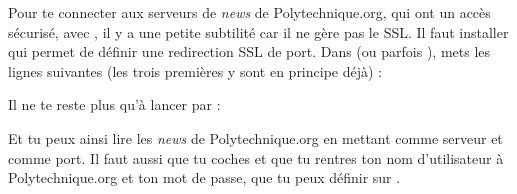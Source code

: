 Pour te connecter aux serveurs de \emph{news} de Polytechnique.org, qui ont un accès sécurisé, avec , il y a une petite subtilité car il
ne gère pas le SSL. Il faut installer  qui permet de définir une redirection SSL de port. Dans  (ou parfois ), mets les lignes suivantes (les trois premières y sont en principe déjà) :

Il ne te reste plus qu'à lancer  par :

Et tu peux ainsi lire les \emph{news} de Polytechnique.org en mettant  comme serveur et
 comme port. Il faut aussi que tu coches  et
que tu rentres ton nom d'utilisateur à Polytechnique.org et ton mot de passe, que tu peux définir
sur .

\pagebreak
